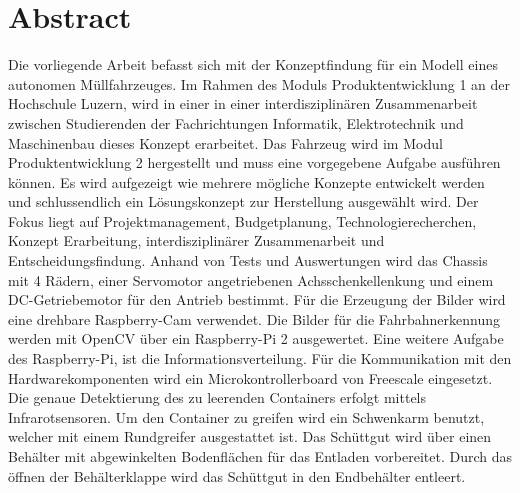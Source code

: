 \section{Abstract}
Die vorliegende Arbeit befasst sich mit der Konzeptfindung für ein Modell eines autonomen Müllfahrzeuges. Im Rahmen des Moduls Produktentwicklung 1 an der Hochschule Luzern, wird in einer in einer interdisziplinären Zusammenarbeit zwischen Studierenden der Fachrichtungen Informatik, Elektrotechnik und Maschinenbau dieses Konzept erarbeitet. Das Fahrzeug wird im Modul Produktentwicklung 2 hergestellt und muss eine vorgegebene Aufgabe ausführen können. Es wird aufgezeigt wie mehrere mögliche Konzepte entwickelt werden und schlussendlich ein Lösungskonzept zur Herstellung ausgewählt wird. Der Fokus liegt auf Projektmanagement, Budgetplanung, Technologierecherchen, Konzept Erarbeitung, interdisziplinärer Zusammenarbeit und Entscheidungsfindung. Anhand von Tests und Auswertungen wird das Chassis mit 4 Rädern, einer Servomotor angetriebenen Achsschenkellenkung und einem DC-Getriebemotor für den Antrieb bestimmt. Für die Erzeugung der Bilder wird eine drehbare Raspberry-Cam verwendet. Die Bilder für die Fahrbahnerkennung werden mit OpenCV über ein Raspberry-Pi 2 ausgewertet. Eine weitere Aufgabe des Raspberry-Pi, ist die Informationsverteilung. Für die Kommunikation mit den Hardwarekomponenten wird ein Microkontrollerboard von Freescale eingesetzt. Die genaue Detektierung des zu leerenden Containers erfolgt mittels Infrarotsensoren. Um den Container zu greifen wird ein Schwenkarm benutzt, welcher mit einem Rundgreifer ausgestattet ist. Das Schüttgut wird über einen Behälter mit abgewinkelten Bodenflächen für das Entladen vorbereitet. Durch das öffnen der Behälterklappe wird das Schüttgut in den Endbehälter entleert.
\clearpage